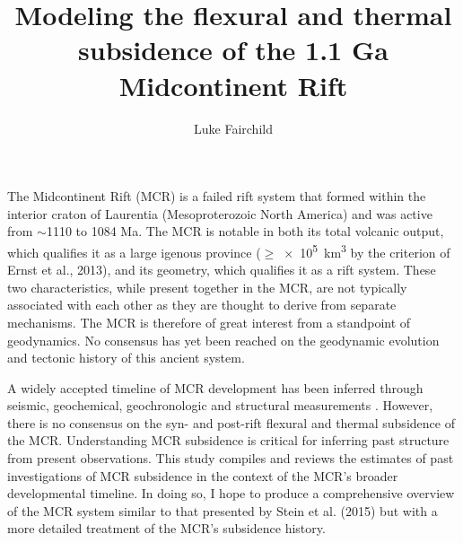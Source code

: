 \documentclass[11pt,letterpaper]{article}
\title{Modeling the flexural and thermal subsidence of the 1.1 Ga Midcontinent Rift}
\author{Luke Fairchild}
\renewenvironment{abstract}
 {\small
  \begin{center}
  \bfseries \abstractname\vspace{-.5em}\vspace{0pt}
  \end{center}
  \list{}{
    \setlength{\leftmargin}{.5cm}%
    \setlength{\rightmargin}{\leftmargin}%
  }%
  \item\relax}
 {\endlist}
\begin{document}
\maketitle{}
\begin{abstract}
The Midcontinent Rift (MCR) is a failed rift system that formed within the interior craton of Laurentia (Mesoproterozoic North America) and was active from $\sim$1110 to 1084 Ma. The MCR is notable in both its total volcanic output, which qualifies it as a large igenous province ($\geq$\SI{e5}{km^3} by the criterion of Ernst et al., 2013\nocite{Ernst2013b}), and its geometry, which qualifies it as a rift system. These two characteristics, while present together in the MCR, are not typically associated with each other as they are thought to derive from separate mechanisms. The MCR is therefore of great interest from a standpoint of geodynamics. No consensus has yet been reached on the geodynamic evolution and tectonic history of this ancient system.\par
A widely accepted timeline of MCR development has been inferred through seismic, geochemical, geochronologic and structural measurements \citep{Cannon1989a,Cannon1992b,White1997a,Stein2015a}. However, there is no consensus on the syn- and post-rift flexural and thermal subsidence of the MCR. Understanding MCR subsidence is critical for inferring past structure from present observations. This study compiles and reviews the estimates of past investigations of MCR subsidence in the context of the MCR's broader developmental timeline. In doing so, I hope to produce a comprehensive overview of the MCR system similar to that presented by Stein et al. (2015) but with a more detailed treatment of the MCR's subsidence history.
\end{abstract}
\end{document}
